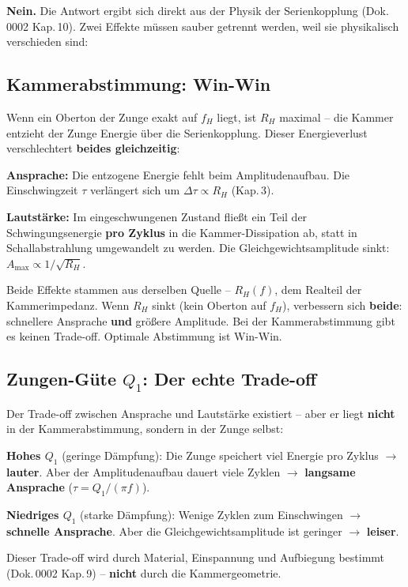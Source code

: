\documentclass[11pt,a4paper]{article}
\begin{document}
\textbf{Nein.} Die Antwort ergibt sich direkt aus der Physik der Serienkopplung (Dok.\,0002 Kap.\,10). Zwei Effekte müssen sauber getrennt werden, weil sie physikalisch verschieden sind:

\subsection{Kammerabstimmung: Win-Win}

Wenn ein Oberton der Zunge exakt auf $f_H$ liegt, ist $R_H$ maximal -- die Kammer entzieht der Zunge Energie über die Serienkopplung. Dieser Energieverlust verschlechtert \textbf{beides gleichzeitig}:

\textbf{Ansprache:} Die entzogene Energie fehlt beim Amplitudenaufbau. Die Einschwingzeit $\tau$ verlängert sich um $\Delta\tau \propto R_H$ (Kap.\,3).

\textbf{Lautstärke:} Im eingeschwungenen Zustand fließt ein Teil der Schwingungsenergie \textbf{pro Zyklus} in die Kammer-Dissipation ab, statt in Schallabstrahlung umgewandelt zu werden. Die Gleichgewichtsamplitude sinkt: $A_\text{max} \propto 1/\sqrt{R_H}$.

Beide Effekte stammen aus derselben Quelle -- $R_H(f)$, dem Realteil der Kammerimpedanz. Wenn $R_H$ sinkt (kein Oberton auf $f_H$), verbessern sich \textbf{beide}: schnellere Ansprache \textbf{und} größere Amplitude. Bei der Kammerabstimmung gibt es keinen Trade-off. Optimale Abstimmung ist Win-Win.

\subsection{Zungen-Güte $Q_1$: Der echte Trade-off}

Der Trade-off zwischen Ansprache und Lautstärke existiert -- aber er liegt \textbf{nicht} in der Kammerabstimmung, sondern in der Zunge selbst:

\textbf{Hohes $Q_1$} (geringe Dämpfung): Die Zunge speichert viel Energie pro Zyklus $\to$ \textbf{lauter}. Aber der Amplitudenaufbau dauert viele Zyklen $\to$ \textbf{langsame Ansprache} ($\tau = Q_1/(\pi f)$).

\textbf{Niedriges $Q_1$} (starke Dämpfung): Wenige Zyklen zum Einschwingen $\to$ \textbf{schnelle Ansprache}. Aber die Gleichgewichtsamplitude ist geringer $\to$ \textbf{leiser}.

Dieser Trade-off wird durch Material, Einspannung und Aufbiegung bestimmt (Dok.\,0002 Kap.\,9) -- \textbf{nicht} durch die Kammergeometrie.
\end{document}
